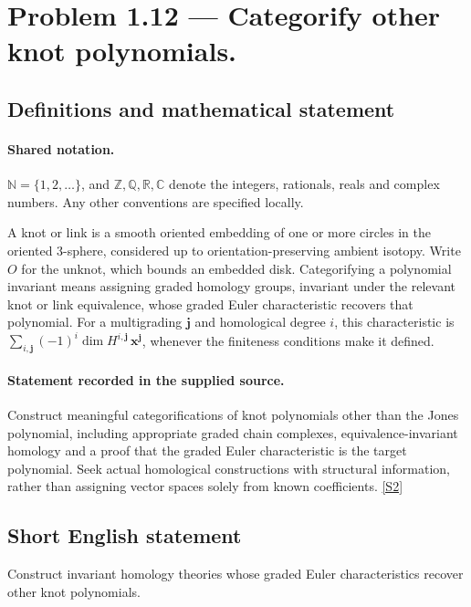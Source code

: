 \documentclass[11pt]{article}
\newcommand{\sref}[2]{\hyperlink{source:#1:#2}{[S#2]}}
\begin{document}
\section{Problem 1.12 — Categorify other knot polynomials.}\label{statement}

\subsection{Definitions and mathematical statement}

\paragraph{Shared notation.}$\mathbb N=\{1,2,\ldots\}$, and $\mathbb Z,\mathbb Q,\mathbb R,\mathbb C$ denote the integers, rationals, reals and complex numbers. Any other conventions are specified locally.


A knot or link is a smooth oriented embedding of one or more circles in the oriented $3$-sphere, considered up to orientation-preserving ambient isotopy. Write $O$ for the unknot, which bounds an embedded disk. Categorifying a polynomial invariant means assigning graded homology groups, invariant under the relevant knot or link equivalence, whose graded Euler characteristic recovers that polynomial. For a multigrading $\mathbf j$ and homological degree $i$, this characteristic is $\sum_{i,\mathbf j}(-1)^i\dim H^{i,\mathbf j}\,\mathbf x^{\mathbf j}$, whenever the finiteness conditions make it defined.
\paragraph{Statement recorded in the supplied source.}
Construct meaningful categorifications of knot polynomials other than the Jones polynomial, including appropriate graded chain complexes, equivalence-invariant homology and a proof that the graded Euler characteristic is the target polynomial. Seek actual homological constructions with structural information, rather than assigning vector spaces solely from known coefficients. \sref{statement}{2}
\subsection{Short English statement}
Construct invariant homology theories whose graded Euler characteristics recover other knot polynomials.
\end{document}
